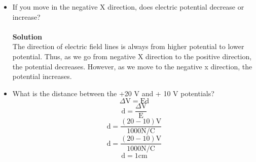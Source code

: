 \documentclass[9pt,addpoints]{exam}
\begin{document}
\begin{questions}
\begin{itemize}
			\item If you move in the negative X direction, does electric potential decrease or increase?\\ \\ \textbf{Solution}\\ 
			The direction of electric field lines is always from higher potential to lower potential. Thus, as we go from negative X direction to the positive direction, the potential decreases. However, as we move to the negative x direction, the potential increases.
			\item What is the distance between the +20 V and + 10 V potentials?
			$$\Delta\text{V}=\text{Ed}$$
			$$\text{d}=\dfrac{\Delta\text{V}}{\text{E}}$$
			$$\text{d}=\dfrac{(20-10)\text{V}}{1000\text{N/C}}$$
			$$\text{d}=\dfrac{(20-10)\text{V}}{1000\text{N/C}}$$
			$$\text{d}=1\text{cm}$$
		\end{itemize}
	\end{questions}		
\end{document}
